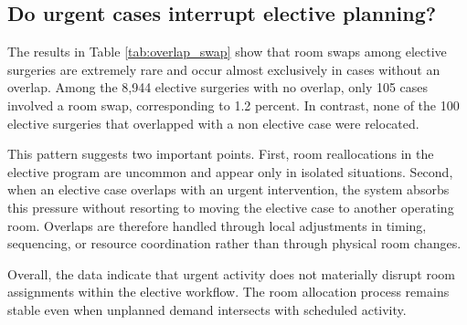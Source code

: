 \documentclass[
]{article}
\begin{document}
\subsection{Do urgent cases interrupt elective
planning?}\label{do-urgent-cases-interrupt-elective-planning}

The results in Table \ref{tab:overlap_swap} show that room swaps among
elective surgeries are extremely rare and occur almost exclusively in
cases without an overlap. Among the 8,944 elective surgeries with no
overlap, only 105 cases involved a room swap, corresponding to 1.2
percent. In contrast, none of the 100 elective surgeries that overlapped
with a non elective case were relocated.

This pattern suggests two important points. First, room reallocations in
the elective program are uncommon and appear only in isolated
situations. Second, when an elective case overlaps with an urgent
intervention, the system absorbs this pressure without resorting to
moving the elective case to another operating room. Overlaps are
therefore handled through local adjustments in timing, sequencing, or
resource coordination rather than through physical room changes.

Overall, the data indicate that urgent activity does not materially
disrupt room assignments within the elective workflow. The room
allocation process remains stable even when unplanned demand intersects
with scheduled activity.
\end{document}
